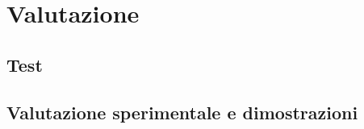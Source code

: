 \chapter{Valutazione}
\label{chap:valutazione}
    \section{Test}
    \label{sec:test}
    \section{Valutazione sperimentale e dimostrazioni}
    \label{sec:valutazione_sperimentale_dimostrazioni}